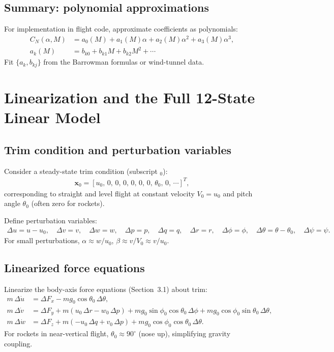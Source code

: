 \documentclass[11pt]{article}
\begin{document}
\subsection{Summary: polynomial approximations}
For implementation in flight code, approximate coefficients as polynomials:
\begin{align}
C_N(\alpha,M) &= a_0(M) + a_1(M)\alpha + a_2(M)\alpha^2 + a_3(M)\alpha^3,\\
a_k(M) &= b_{k0} + b_{k1}M + b_{k2}M^2 + \cdots
\end{align}
Fit $\{a_k, b_{kj}\}$ from the Barrowman formulas or wind-tunnel data.

\section{Linearization and the Full 12-State Linear Model}

\subsection{Trim condition and perturbation variables}
Consider a steady-state trim condition (subscript $_0$):
\begin{align}
\mathbf{x}_0 = [u_0,\,0,\,0,\,0,\,0,\,0,\,0,\,\theta_0,\,0,\,\cdots]^T,
\end{align}
corresponding to straight and level flight at constant velocity $V_0=u_0$ and pitch angle $\theta_0$ (often zero for rockets).

Define perturbation variables:
\begin{align}
\Delta u = u-u_0,\quad \Delta v = v,\quad \Delta w = w,\quad \Delta p = p,\quad \Delta q = q,\quad \Delta r = r,\quad \Delta\phi=\phi,\quad\Delta\theta=\theta-\theta_0,\quad\Delta\psi=\psi.
\end{align}
For small perturbations, $\alpha\approx w/u_0$, $\beta\approx v/V_0\approx v/u_0$.

\subsection{Linearized force equations}
Linearize the body-axis force equations (Section~3.1) about trim:
\begin{align}
m\,\Delta\dot u &= \Delta F_x - mg_0\cos\theta_0\,\Delta\theta,\\
m\,\Delta\dot v &= \Delta F_y + m(u_0\,\Delta r - w_0\,\Delta p) + mg_0\sin\phi_0\cos\theta_0\,\Delta\phi + mg_0\cos\phi_0\sin\theta_0\,\Delta\theta,\\
m\,\Delta\dot w &= \Delta F_z + m(-u_0\,\Delta q + v_0\,\Delta p) + mg_0\cos\phi_0\cos\theta_0\,\Delta\theta.
\end{align}
For rockets in near-vertical flight, $\theta_0\approx 90^\circ$ (nose up), simplifying gravity coupling.
\end{document}
